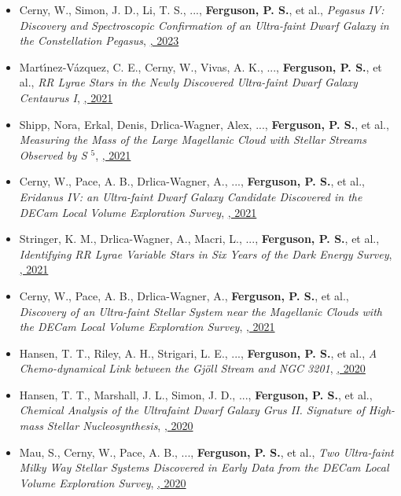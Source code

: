 \begin{itemize}[itemsep=1pt]
    \item {Cerny}, W., {Simon}, J. D., {Li}, T. S., ..., \textbf{Ferguson, P. S.}, et al., \textit{{Pegasus IV: Discovery and Spectroscopic Confirmation of an Ultra-faint Dwarf Galaxy in the Constellation Pegasus}}, \href{https://ui.adsabs.harvard.edu/abs/2023ApJ...942..111C}{\textbf{\apj}, 2023}
    \item {Mart{\'\i}nez-V{\'a}zquez}, C. E., {Cerny}, W., {Vivas}, A. K., ..., \textbf{Ferguson, P. S.}, et al., \textit{{RR Lyrae Stars in the Newly Discovered Ultra-faint Dwarf Galaxy Centaurus I}}, \href{https://ui.adsabs.harvard.edu/abs/2021AJ....162..253M}{\textbf{\aj}, 2021}
    \item {Shipp}, Nora, {Erkal}, Denis, {Drlica-Wagner}, Alex, ..., \textbf{Ferguson, P. S.}, et al., \textit{{Measuring the Mass of the Large Magellanic Cloud with Stellar Streams Observed by S $^{5}$}}, \href{https://ui.adsabs.harvard.edu/abs/2021ApJ...923..149S}{\textbf{\apj}, 2021}
    \item {Cerny}, W., {Pace}, A. B., {Drlica-Wagner}, A., ..., \textbf{Ferguson, P. S.}, et al., \textit{{Eridanus IV: an Ultra-faint Dwarf Galaxy Candidate Discovered in the DECam Local Volume Exploration Survey}}, \href{https://ui.adsabs.harvard.edu/abs/2021ApJ...920L..44C}{\textbf{\apjl}, 2021}
    \item {Stringer}, K. M., {Drlica-Wagner}, A., {Macri}, L., ..., \textbf{Ferguson, P. S.}, et al., \textit{{Identifying RR Lyrae Variable Stars in Six Years of the Dark Energy Survey}}, \href{https://ui.adsabs.harvard.edu/abs/2021ApJ...911..109S}{\textbf{\apj}, 2021}
    \item {Cerny}, W., {Pace}, A. B., {Drlica-Wagner}, A., \textbf{Ferguson, P. S.}, et al., \textit{{Discovery of an Ultra-faint Stellar System near the Magellanic Clouds with the DECam Local Volume Exploration Survey}}, \href{https://ui.adsabs.harvard.edu/abs/2021ApJ...910...18C}{\textbf{\apj}, 2021}
    \item {Hansen}, T. T., {Riley}, A. H., {Strigari}, L. E., ..., \textbf{Ferguson, P. S.}, et al., \textit{{A Chemo-dynamical Link between the Gj{\"o}ll Stream and NGC 3201}}, \href{https://ui.adsabs.harvard.edu/abs/2020ApJ...901...23H}{\textbf{\apj}, 2020}
    \item {Hansen}, T. T., {Marshall}, J. L., {Simon}, J. D., ..., \textbf{Ferguson, P. S.}, et al., \textit{{Chemical Analysis of the Ultrafaint Dwarf Galaxy Grus II. Signature of High-mass Stellar Nucleosynthesis}}, \href{https://ui.adsabs.harvard.edu/abs/2020ApJ...897..183H}{\textbf{\apj}, 2020}
    \item {Mau}, S., {Cerny}, W., {Pace}, A. B., ..., \textbf{Ferguson, P. S.}, et al., \textit{{Two Ultra-faint Milky Way Stellar Systems Discovered in Early Data from the DECam Local Volume Exploration Survey}}, \href{https://ui.adsabs.harvard.edu/abs/2020ApJ...890..136M}{\textbf{\apj}, 2020}
\end{itemize}
